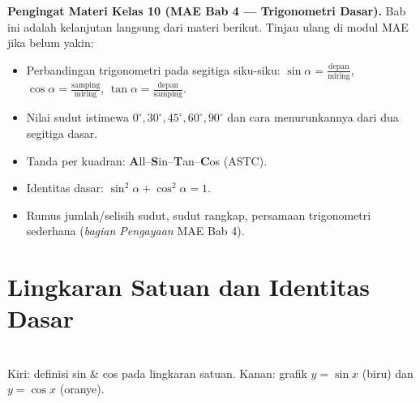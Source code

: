 \documentclass[11pt,a4paper]{report}
\theoremstyle{gaya}
\begin{document}
\begin{catatan}
\textbf{Pengingat Materi Kelas 10 (MAE Bab 4 --- Trigonometri Dasar).} Bab ini adalah kelanjutan langsung dari materi berikut. Tinjau ulang di modul MAE jika belum yakin:
\begin{itemize}[leftmargin=*,topsep=2pt]
  \item Perbandingan trigonometri pada segitiga siku-siku: $\sin\alpha=\tfrac{\text{depan}}{\text{miring}}$, $\cos\alpha=\tfrac{\text{samping}}{\text{miring}}$, $\tan\alpha=\tfrac{\text{depan}}{\text{samping}}$.
  \item Nilai sudut istimewa $0^\circ,30^\circ,45^\circ,60^\circ,90^\circ$ dan cara menurunkannya dari dua segitiga dasar.
  \item Tanda per kuadran: \textbf{A}ll--\textbf{S}in--\textbf{T}an--\textbf{C}os (ASTC).
  \item Identitas dasar: $\sin^2\alpha+\cos^2\alpha=1$.
  \item Rumus jumlah/selisih sudut, sudut rangkap, persamaan trigonometri sederhana (\emph{bagian Pengayaan} MAE Bab 4).
\end{itemize}
\end{catatan}

\section{Lingkaran Satuan dan Identitas Dasar}
\begin{center}
\qquad
{}\\
\small Kiri: definisi sin \& cos pada lingkaran satuan. Kanan: grafik $y=\sin x$ (biru) dan $y=\cos x$ (oranye).
\end{center}
\end{document}
